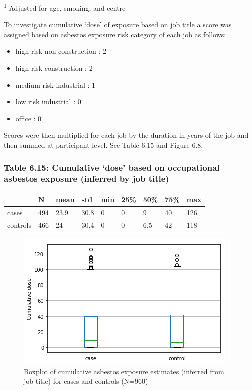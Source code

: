 \textsuperscript{1} Adjusted for age, smoking, and centre

To investigate cumulative `dose' of exposure based on job title a score
was assigned based on asbestos exposure risk category of each job as
follows:

\begin{itemize}
\tightlist
\item
  high-risk non-construction : 2
\item
  high-risk construction : 2
\item
  medium risk industrial : 1
\item
  low risk industrial : 0
\item
  office : 0
\end{itemize}

Scores were then multiplied for each job by the duration in years of the
job and then summed at participant level. See Table 6.15 and Figure 6.8.

\hypertarget{table-6.15-cumulative-dose-based-on-occupational-asbestos-exposure-inferred-by-job-title}{%
\subsubsection{Table 6.15: Cumulative `dose' based on occupational
asbestos exposure (inferred by job
title)}\label{table-6.15-cumulative-dose-based-on-occupational-asbestos-exposure-inferred-by-job-title}}

\begin{longtable}[]{@{}lllllllll@{}}
\toprule
& N & mean & std & min & 25\% & 50\% & 75\% & max\tabularnewline
\midrule
\endhead
cases & 494 & 23.9 & 30.8 & 0 & 0 & 9 & 40 & 126\tabularnewline
controls & 466 & 24 & 30.4 & 0 & 0 & 6.5 & 42 & 118\tabularnewline
\bottomrule
\end{longtable}

\begin{figure}
\centering
\includegraphics{source/figures/dose.png}
\caption{Boxplot of cumulative asbestos exposure estimates (inferred
from job title) for cases and controls (N=960)}
\end{figure}

